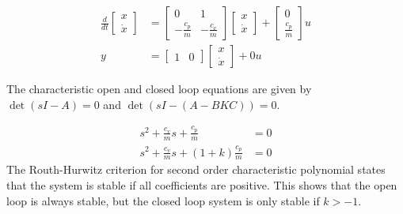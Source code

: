 \documentclass{article}
\begin{document}
\begin{align}
    \frac{d}{dt} \begin{bmatrix}
        x \\
        \dot{x}
    \end{bmatrix} &= \begin{bmatrix}
        0 & 1 \\
        -\frac{c_p}{m} & -\frac{c_v}{m}
    \end{bmatrix} \begin{bmatrix}
        x \\
        \dot{x}
    \end{bmatrix} + \begin{bmatrix}
        0 \\
        \frac{c_p}{m}
    \end{bmatrix} u \\
    y &= \begin{bmatrix}
        1 & 0
    \end{bmatrix} \begin{bmatrix}
        x \\
        \dot{x}
    \end{bmatrix} + 0u
\end{align}

The characteristic open and closed loop equations are given by $\det(sI - A) = 0$ and $\det(sI - (A-BKC)) = 0$.

\begin{align}
    s^2 + \frac{c_v}{m}s + \frac{c_p}{m} &= 0 \\
    s^2 + \frac{c_v}{m}s + (1+k)\frac{c_p}{m} &= 0
\end{align}
The Routh-Hurwitz criterion for second order characteristic polynomial states that the system is stable if all coefficients are positive.
This shows that the open loop is always stable, but the closed loop system is only stable if $k > -1$.
\end{document}
